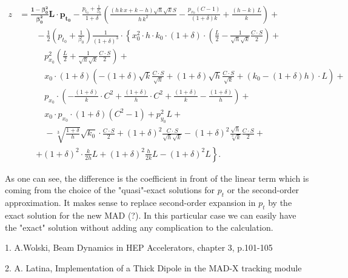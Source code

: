 \documentclass[12pt]{article}
\begin{document}
\begin{align}
z & =\pmb {\frac{1-\beta_{0}^{2}}{\beta_{0}^{2}}L\cdot p_{t_{0}}}-\frac{p_{t_{0}}+\frac{1}{\beta_{0}}}{1+\delta}\left(\frac{\left(h\, k\, x+k-h\right)\sqrt{h}\sqrt{k}S}{h\, k^{2}}-\frac{p_{x_{0}}\left(C-1\right)}{\left(1+\delta\right)k}+\frac{\left(h-k\right)\, L}{k}\right)+ \qquad \nonumber \\
 & \qquad-\frac{1}{2}\left(p_{t_{0}}+\frac{1}{\beta_{0}}\right)\frac{1}{\left(1+\delta\right)^{3}}\cdot\left\{ x_{0}^{2}\right.\cdot h\cdot k_{0}\cdot\left(1+\delta\right)\cdot\left(\frac{L}{2}-\frac{1}{\sqrt{h}\sqrt{k}}\frac{C\cdot S}{2}\right)+ \nonumber \\
 & \qquad\quad p_{x_{0}}^{2}\left(\frac{L}{2}+\frac{1}{\sqrt{h}\sqrt{k}}\frac{C\cdot S}{2}\right) + \nonumber \\
 & \qquad\quad  x_{0}\cdot\left(1+\delta\right)\left(-\left(1+\delta\right)\sqrt{k}\frac{C\cdot S}{\sqrt{h}}+\left(1+\delta\right)\sqrt{h}\frac{C\cdot S}{\sqrt{k}}+\left(k_{0}-\left(1+\delta\right)h\right)\cdot L\right) + \nonumber \\
 & \qquad\quad  p_{x_{0}}\cdot\left(-\frac{\left(1+\delta\right)}{k}\cdot C^{2}+\frac{\left(1+\delta\right)}{h}\cdot C^{2}+\frac{\left(1+\delta\right)}{k}-\frac{\left(1+\delta\right)}{h}\right)+ \nonumber \\
 & \qquad\quad x_{0}\cdot p_{x_{0}}\cdot\left(1+\delta\right)\left(C^{2}-1\right)+p_{y_{0}}^{2}L+ \nonumber \\
 & \qquad\quad-\sqrt[3]{\frac{1+\delta}{h}}\sqrt{k_{0}}\cdot\frac{C\cdot S}{2}+\left(1+\delta\right)^{2}\frac{C\cdot S}{\sqrt{h}\sqrt{k}}-\left(1+\delta\right)^{2}\frac{\sqrt{h}}{\sqrt[3]{k}}\frac{C\cdot S}{2}+ \nonumber \\
 & \qquad\left.+\left(1+\delta\right)^{2}\cdot\frac{k}{2h}L+\left(1+\delta\right)^{2}\frac{h}{2k}L-\left(1+\delta\right)^{2}L\right\} .
 \label{eq:Z Andrea}
\end{align}

As one can see, the difference is the coefficient in front of the linear term which is coming from the choice of the "quasi"-exact solutions for $p_{t}$ or the second-order approximation. It makes sense to replace second-order expansion in $p_{t}$ by the exact solution for the new MAD (?). In this particular case we can easily have the "exact" solution without adding any complication to the calculation. 


{\it
{}

1. A.Wolski, Beam Dynamics in HEP Accelerators, chapter 3, p.101-105 


2. A. Latina, Implementation of a Thick Dipole in the MAD-X tracking module
}
\end{document}
